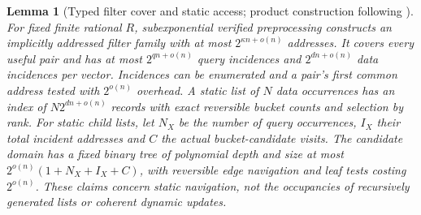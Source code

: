\documentclass[10pt,a4paper]{article}
\newtheorem{lemma}[theorem]{Lemma}
\theoremstyle{definition}
\begin{document}
\begin{lemma}[Typed filter cover and static access; product construction following {\cite[Proposition~5]{HG26}}]
\label{lem:filter-access}
For fixed finite rational $R$, subexponential verified preprocessing
constructs an implicitly addressed filter family with at most
$2^{\kappa n+o(n)}$ addresses. It covers every useful pair and has at most
$2^{qn+o(n)}$ query incidences and $2^{dn+o(n)}$ data incidences per vector.
Incidences can be enumerated and a pair's first common address tested
with $2^{o(n)}$ overhead. A static list of $N$ data occurrences has an
index of $N2^{dn+o(n)}$ records with exact reversible bucket counts and
selection by rank. For static child lists, let $N_X$ be the number of
query occurrences, $I_X$ their total incident addresses and $C$ the
actual bucket-candidate visits. The candidate domain has a fixed binary
tree of polynomial depth and size at most
$2^{o(n)}(1+N_X+I_X+C)$, with reversible edge navigation and leaf tests
costing $2^{o(n)}$. These claims concern static navigation, not the
occupancies of recursively generated lists or coherent dynamic updates.
\end{lemma}
\end{document}
